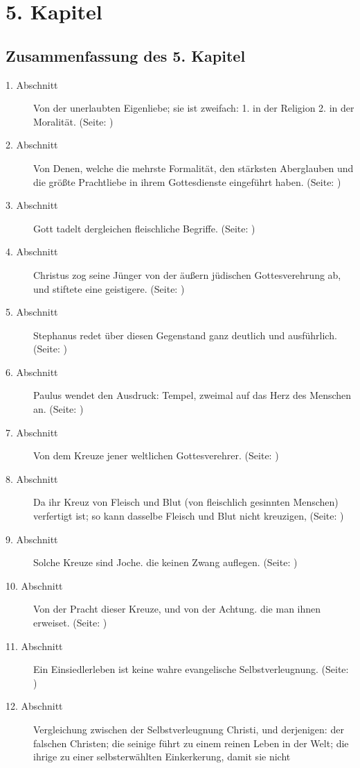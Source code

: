 \chapter{5. Kapitel} \label{kap5}

\section{Zusammenfassung des 5. Kapitel}
\footnotesize
\begin{description}
\item[1. Abschnitt] Von der unerlaubten Eigenliebe; sie ist zweifach: 1. in der
Religion  2. in der Moralität. (Seite: \pageref{kap5_ab1})
\item[2. Abschnitt] Von Denen, welche die mehrste Formalität, den stärksten
Aberglauben und die größte Prachtliebe in ihrem Gottesdienste eingeführt haben.
(Seite: \pageref{kap5_ab2})
\item[3. Abschnitt] Gott tadelt dergleichen fleischliche Begriffe. (Seite:
\pageref{kap5_ab3})
\item[4. Abschnitt] Christus zog seine Jünger von der äußern jüdischen
Gottesverehrung ab, und stiftete eine geistigere. (Seite: \pageref{kap5_ab4})
\item[5. Abschnitt] Stephanus redet über diesen Gegenstand ganz deutlich und
ausführlich. (Seite: \pageref{kap5_ab5})
\item[6. Abschnitt] Paulus wendet den Ausdruck: Tempel, zweimal auf das Herz des
Menschen an. (Seite: \pageref{kap5_ab6})
\item[7. Abschnitt] Von dem Kreuze jener weltlichen Gottesverehrer. (Seite:
\pageref{kap5_ab7})
\item[8. Abschnitt] Da ihr Kreuz von Fleisch und Blut (von fleischlich gesinnten
Menschen) verfertigt ist; so kann dasselbe Fleisch und Blut nicht kreuzigen,
(Seite: \pageref{kap5_ab8})
\item[9. Abschnitt] Solche Kreuze sind Joche. die keinen Zwang auflegen. (Seite:
\pageref{kap5_ab9})
\item[10. Abschnitt] Von der Pracht dieser Kreuze, und von der Achtung. die man
ihnen erweiset. (Seite: \pageref{kap5_ab10})
\item[11. Abschnitt] Ein Einsiedlerleben ist keine wahre evangelische
Selbstverleugnung. (Seite: \pageref{kap5_ab11})
\item[12. Abschnitt] Vergleichung zwischen der Selbstverleugnung Christi, und
derjenigen: der falschen Christen; die seinige führt zu einem reinen Leben in
der Welt; die ihrige zu einer selbsterwählten Einkerkerung, damit sie nicht

\end{description}
